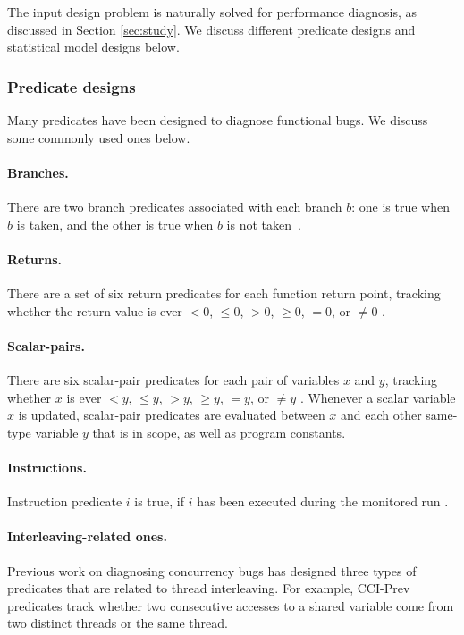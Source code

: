 The input design problem is naturally solved for performance diagnosis, as
discussed in Section \ref{sec:study}. We discuss different predicate designs
and statistical model designs below.

\subsubsection{Predicate designs}
Many predicates have been designed to diagnose functional bugs.
We discuss some commonly used ones below.

\paragraph{Branches.} There are two branch 
predicates associated
with each branch $b$: one is true when $b$ is taken, and the other is true when
$b$ is not taken~\citep{liblit03,liblit05}.

\paragraph{Returns.} There are a set of six return predicates
for each function return point, tracking whether the return value is ever
$<0$, $\leq 0$, $>0$, $\geq 0$, $=0$, or $\neq 0$ \citep{liblit03,liblit05}.

\paragraph{Scalar-pairs.} There are six scalar-pair predicates
for each pair of variables $x$ and $y$, tracking whether $x$ is ever 
$<y$, $\leq y$, $>y$, $\geq y$, $=y$, or $\neq y$ \citep{liblit03,liblit05}.
Whenever a scalar
variable $x$ is updated, scalar-pair predicates are evaluated between $x$ and
each other same-type variable $y$ that is in scope, as well as program 
constants.

\paragraph{Instructions.} Instruction predicate $i$ is true, if 
$i$ has been executed during the monitored run 
\citep{tarantula1,tarantula2,tarantula.darko}.

\paragraph{Interleaving-related ones.} Previous work on diagnosing
concurrency bugs \citep{CCI} has designed three types of predicates that are 
related to
thread interleaving. For example, CCI-Prev predicates track whether two 
consecutive accesses to a
shared variable come from two distinct threads or the same thread.

